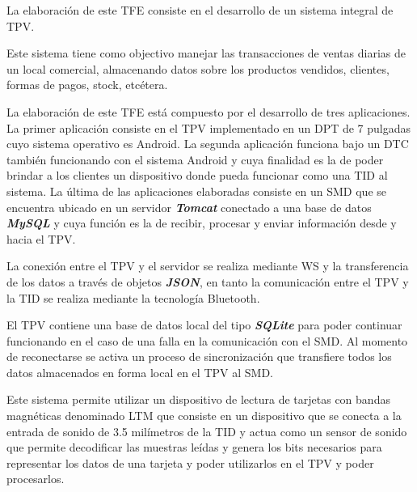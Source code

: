 


{%
\slshape

La elaboraci\'on de este \ac{TFE} consiste en el desarrollo de un sistema integral de \ac{TPV}.

Este sistema tiene como objectivo manejar las transacciones de ventas diarias de un local comercial, almacenando datos sobre los productos vendidos, clientes, formas de pagos, stock, etc\'etera.

La elaboraci\'on de este \ac{TFE} est\'a compuesto por el desarrollo de tres aplicaciones. La primer aplicaci\'on consiste en el \ac{TPV} implementado en un \acf{DPT} de 7 pulgadas cuyo sistema operativo es Android\Si{\texttrademark}. La segunda aplicaci\'on funciona bajo un \ac{DTC} tambi\'en funcionando con el sistema Android\Si{\texttrademark} y cuya finalidad es la de poder brindar a los clientes un dispositivo donde pueda funcionar como una \ac{TID} al sistema. La \'ultima de las aplicaciones elaboradas consiste en un \ac{SMD} que se encuentra ubicado en un servidor \textbf{\textit{Tomcat}} conectado a una base de datos \textbf{\textit{MySQL}} y cuya funci\'on es la de recibir, procesar y enviar informaci\'on desde y hacia el \ac{TPV}. 

La conexi\'on entre el \ac{TPV} y el servidor se realiza mediante \ac{WS} y la transferencia de los datos a trav\'es de objetos \textbf{\textit{JSON}}, en tanto la comunicaci\'on entre el \ac{TPV} y la \ac{TID} se realiza mediante la tecnolog\'ia Bluetooth\Si{\texttrademark}.

El \ac{TPV} contiene una base de datos local del tipo \textbf{\textit{SQLite}} para poder continuar funcionando en el caso de una falla en la comunicaci\'on con el \ac{SMD}. Al momento de reconectarse se activa un proceso de sincronizaci\'on que transfiere todos los datos almacenados en forma local en el \ac{TPV} al \ac{SMD}.

Este sistema permite utilizar un dispositivo de lectura de tarjetas con bandas magn\'eticas denominado \ac{LTM} que consiste en un dispositivo que se conecta a la entrada de sonido de 3.5 mil\'imetros de la \ac{TID} y actua como un sensor de sonido que permite decodificar las muestras le\'idas y genera los bits necesarios para representar los datos de una tarjeta y poder utilizarlos en el \ac{TPV} y poder procesarlos. 

}
